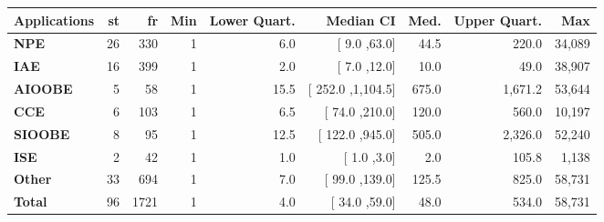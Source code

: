 \begin{tabularx}{0.94\textwidth}{ l r r r r r r r r} 
\hline 
\textbf{Applications} & \textbf{st} & \textbf{fr}& \textbf{Min} & \textbf{Lower Quart.} & \textbf{Median CI} & \textbf{Med.} & \textbf{Upper Quart.} & \textbf{Max} \\ 
\hline 
\textbf{ NPE } & 26  & 330  & 1  & 6.0  & [ 9.0 ,63.0] & 44.5  & 220.0  & 34,089  \\ 
\textbf{ IAE } & 16  & 399  & 1  & 2.0  & [ 7.0 ,12.0] & 10.0  & 49.0  & 38,907  \\ 
\textbf{ AIOOBE } & 5  & 58  & 1  & 15.5  & [ 252.0 ,1,104.5] & 675.0  & 1,671.2  & 53,644  \\ 
\textbf{ CCE } & 6  & 103  & 1  & 6.5  & [ 74.0 ,210.0] & 120.0  & 560.0  & 10,197  \\ 
\textbf{ SIOOBE } & 8  & 95  & 1  & 12.5  & [ 122.0 ,945.0] & 505.0  & 2,326.0  & 52,240  \\ 
\textbf{ ISE } & 2  & 42  & 1  & 1.0  & [ 1.0 ,3.0] & 2.0  & 105.8  & 1,138  \\ 
\textbf{ Other } & 33  & 694  & 1  & 7.0  & [ 99.0 ,139.0] & 125.5  & 825.0  & 58,731  \\ 
\hline 
\textbf{Total} & 96  & 1721  & 1  & 4.0  & [ 34.0 ,59.0] & 48.0  & 534.0  & 58,731  \\ 
\hline 
\end{tabularx} 
